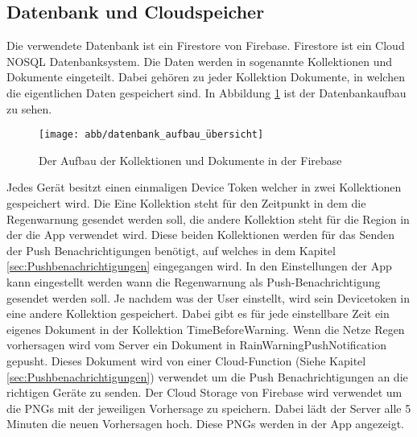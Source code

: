 \subsection{Datenbank und Cloudspeicher}\label{datenbank und cloudspeicher}
Die verwendete Datenbank ist ein Firestore von Firebase. Firestore ist ein Cloud NOSQL Datenbanksystem. 
Die Daten werden in sogenannte Kollektionen und Dokumente eingeteilt. 
Dabei gehören zu jeder Kollektion Dokumente, in welchen die eigentlichen Daten gespeichert sind. 
In Abbildung \ref{fig:datenbank_aufbau} ist der Datenbankaufbau zu sehen.
\begin{figure}[h]
 \centering
 \texttt{[image: abb/datenbank\_aufbau\_übersicht]}
 \caption[Datenbankarchitektur]{Der Aufbau der Kollektionen und Dokumente in der Firebase}
\label{fig:datenbank_aufbau}
\end{figure}

Jedes Gerät besitzt einen einmaligen Device Token welcher in zwei Kollektionen gespeichert wird. 
Die Eine Kollektion steht für den Zeitpunkt in dem die Regenwarnung gesendet werden soll, die andere Kollektion steht für die Region in der die App verwendet wird. 
Diese beiden Kollektionen werden für das Senden der Push Benachrichtigungen benötigt, auf welches in dem Kapitel \ref{sec:Pushbenachrichtigungen} eingegangen wird. 
In den Einstellungen der App kann eingestellt werden wann die Regenwarnung als Push-Benachrichtigung gesendet werden soll.
Je nachdem was der User einstellt, wird sein Devicetoken in eine andere Kollektion gespeichert. 
Dabei gibt es für jede einstellbare Zeit ein eigenes Dokument in der Kollektion TimeBeforeWarning. 
Wenn die Netze Regen vorhersagen wird vom Server ein Dokument in RainWarningPushNotification gepusht. 
Dieses Dokument wird von einer Cloud-Function (Siehe Kapitel \ref{sec:Pushbenachrichtigungen}) verwendet um die Push Benachrichtigungen an die richtigen Geräte zu senden.
Der Cloud Storage von Firebase wird verwendet um die PNGs mit der jeweiligen Vorhersage zu speichern.
Dabei lädt der Server alle 5 Minuten die neuen Vorhersagen hoch. Diese PNGs werden in der App angezeigt. 